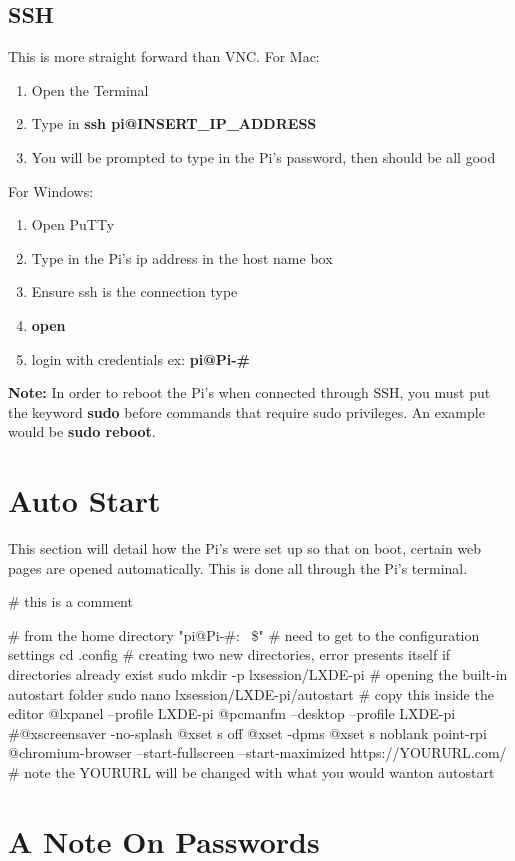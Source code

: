 \documentclass[12pt]{extarticle}
\begin{document}
\subsection{SSH}
This is more straight forward than VNC. \newline \newline For Mac:
\begin{enumerate}
  \item Open the Terminal
  \item Type in \textbf{ssh pi@INSERT\_IP\_ADDRESS}
  \item You will be prompted to type in the Pi's password, then should be all good
\end{enumerate}
For Windows:
\begin{enumerate}
  \item Open PuTTy
  \item Type in the Pi's ip address in the host name box
  \item Ensure ssh is the connection type
  \item \textbf{open}
  \item login with credentials ex: \textbf{pi@Pi-\#}
\end{enumerate}
\newline
\textbf{Note: }In order to reboot the Pi's when connected through SSH, you must put the keyword \textbf{sudo} before commands that require sudo privileges. An example would be \textbf{sudo reboot}. 

\newpage
\section{Auto Start}
This section will detail how the Pi's were set up so that on boot, certain web pages are opened automatically. This is done all through the Pi's terminal. \newline
{\selectfont
\# this is a comment

\# from the home directory "pi@Pi-#:~ \$"
\# need to get to the configuration settings
cd .config \newline
\# creating two new directories, error presents itself if directories already exist
sudo mkdir -p lxsession/LXDE-pi \newline
\# opening the built-in autostart folder
sudo nano lxsession/LXDE-pi/autostart \newline
\# copy this inside the editor
@lxpanel --profile LXDE-pi
@pcmanfm --desktop --profile LXDE-pi
#@xscreensaver -no-splash
@xset s off
@xset -dpms
@xset s noblank
point-rpi
@chromium-browser --start-fullscreen --start-maximized https://YOURURL.com/ \newline
\# note the YOURURL will be changed with what you would wanton autostart

}

\section{A Note On Passwords}
\end{document}
